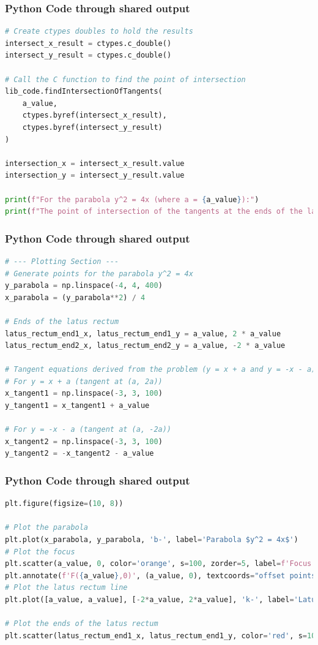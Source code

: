 \documentclass{beamer}
\begin{document}
\begin{frame}[fragile]
\frametitle{Python Code through shared output}
\begin{lstlisting}[language=Python]
# Create ctypes doubles to hold the results
intersect_x_result = ctypes.c_double()
intersect_y_result = ctypes.c_double()

# Call the C function to find the point of intersection
lib_code.findIntersectionOfTangents(
    a_value,
    ctypes.byref(intersect_x_result),
    ctypes.byref(intersect_y_result)
)

intersection_x = intersect_x_result.value
intersection_y = intersect_y_result.value

print(f"For the parabola y^2 = 4x (where a = {a_value}):")
print(f"The point of intersection of the tangents at the ends of the latus rectum is ({intersection_x:.2f}, {intersection_y:.2f})")
\end{lstlisting}
\end{frame}

\begin{frame}[fragile]
\frametitle{Python Code through shared output}
\begin{lstlisting}[language=Python]
# --- Plotting Section ---
# Generate points for the parabola y^2 = 4x
y_parabola = np.linspace(-4, 4, 400)
x_parabola = (y_parabola**2) / 4

# Ends of the latus rectum
latus_rectum_end1_x, latus_rectum_end1_y = a_value, 2 * a_value
latus_rectum_end2_x, latus_rectum_end2_y = a_value, -2 * a_value

# Tangent equations derived from the problem (y = x + a and y = -x - a)
# For y = x + a (tangent at (a, 2a))
x_tangent1 = np.linspace(-3, 3, 100)
y_tangent1 = x_tangent1 + a_value

# For y = -x - a (tangent at (a, -2a))
x_tangent2 = np.linspace(-3, 3, 100)
y_tangent2 = -x_tangent2 - a_value
\end{lstlisting}
\end{frame}

\begin{frame}[fragile]
\frametitle{Python Code through shared output}
\begin{lstlisting}[language=Python]
plt.figure(figsize=(10, 8))

# Plot the parabola
plt.plot(x_parabola, y_parabola, 'b-', label='Parabola $y^2 = 4x$')
# Plot the focus
plt.scatter(a_value, 0, color='orange', s=100, zorder=5, label=f'Focus ({a_value}, 0)')
plt.annotate(f'F({a_value},0)', (a_value, 0), textcoords="offset points", xytext=(5,5), ha='left')
# Plot the latus rectum line
plt.plot([a_value, a_value], [-2*a_value, 2*a_value], 'k-', label='Latus Rectum (x=1)')

# Plot the ends of the latus rectum
plt.scatter(latus_rectum_end1_x, latus_rectum_end1_y, color='red', s=100, zorder=5, label=f'End L ({latus_rectum_end1_x},{latus_rectum_end1_y})')
\end{lstlisting}
\end{frame}
\end{document}
